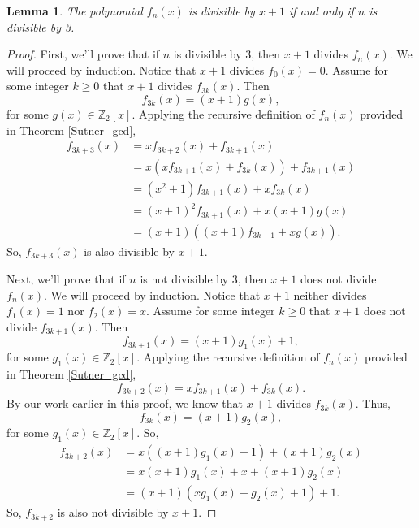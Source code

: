 \documentclass[a4paper]{article}
\newtheorem{lemma}{Lemma}
\newcommand{\Z}{\mathbb{Z}}
\begin{document}
	\begin{lemma}\label{x-plus1-divides-threeven}
		The polynomial $f_n(x)$ is divisible by $x+1$ if and only if $n$ is divisible by 3.
	\end{lemma}
	\begin{proof}
		First, we'll prove that if $n$ is divisible by 3, then $x+1$ divides $f_n(x)$.
		We will proceed by induction.
		Notice that $x+1$ divides $f_0(x) = 0$.
		Assume for some integer $k \geq 0$ that $x+1$ divides $f_{3k}(x)$.
		Then
		\begin{equation*}
			f_{3k}(x) = (x+1)g(x),
		\end{equation*}
		for some $g(x) \in \Z_2[x]$.
		Applying the recursive definition of $f_n(x)$ provided in Theorem \ref{Sutner_gcd},
		\begin{align*}
			f_{3k+3}(x) &= xf_{3k+2}(x) + f_{3k+1}(x) \\
				&= x\left(xf_{3k+1}(x) + f_{3k}(x)\right) + f_{3k+1}(x) \\
				&= (x^2+1)f_{3k+1}(x) + xf_{3k}(x) \\
				&= (x+1)^2f_{3k+1}(x) + x(x+1)g(x) \\
				&= (x+1)\left((x+1)f_{3k+1} + xg(x)\right).
		\end{align*}
		So, $f_{3k+3}(x)$ is also divisible by $x+1$.
		
		Next, we'll prove that if $n$ is not divisible by 3, then $x+1$ does not divide $f_n(x)$.
		We will proceed by induction.
		Notice that $x+1$ neither divides $f_1(x) = 1$ nor $f_2(x) = x$.
		Assume for some integer $k \geq 0$ that $x+1$ does not divide $f_{3k+1}(x)$.
		Then
		\begin{equation*}
			f_{3k+1}(x) = (x+1)g_1(x) + 1,
		\end{equation*}
		for some $g_1(x) \in \Z_2[x]$.
		Applying the recursive definition of $f_n(x)$ provided in Theorem \ref{Sutner_gcd},
		\begin{equation*}
			f_{3k+2}(x) = xf_{3k+1}(x) + f_{3k}(x).
		\end{equation*}
		By our work earlier in this proof, we know that $x+1$ divides $f_{3k}(x)$.
		Thus,
		\begin{equation*}
			f_{3k}(x) = (x+1)g_2(x),
		\end{equation*}
		for some $g_1(x) \in \Z_2[x]$.
		So,
		\begin{align*}
			f_{3k+2}(x) &= x\left((x+1)g_1(x) + 1\right) + (x+1)g_2(x) \\
				&= x(x+1)g_1(x) + x + (x+1)g_2(x) \\
				&= (x+1)\left(xg_1(x) + g_2(x) + 1\right) + 1.
		\end{align*}
		So, $f_{3k+2}$ is also not divisible by $x+1$.
		

\end{proof}
\end{document}

